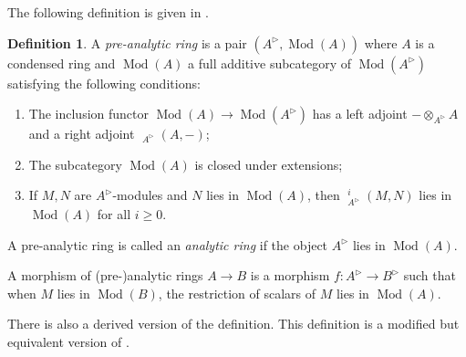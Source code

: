 \documentclass{article}
\theoremstyle{plain}
\theoremstyle{definition}
\newtheorem{defi}[thm]{Definition}
\theoremstyle{remark}
\DeclareMathOperator{\Homs}{\underline{Hom}}
\DeclareMathOperator{\modcat}{Mod}
\DeclareMathOperator{\exts}{\underline{Ext}}
\newcommand{\huflag}{\triangleright}
\begin{document}
The following definition is given in
\cite[\href{https://www.youtube.com/watch?v=dIwBTJNN7a0\&list=PLx5f8IelFRgGmu6gmL-Kf\_Rl\_6Mm7juZO\&index=8\&t=1633s}{Video 8, 27:13}]{ihesvid}.
\begin{defi}
A \emph{pre-analytic ring} is a pair $ (A ^{\huflag}, \modcat (A)) $ where $ A $ is a condensed ring and
$ \modcat (A) $ a full additive subcategory of $ \modcat (A ^{\huflag}) $ satisfying the following conditions:

\begin{enumerate}
\item The inclusion functor $ \modcat (A)\to \modcat (A ^{\huflag}) $ has a left adjoint
$ -\otimes _{A ^{\huflag}} A $ and a right adjoint $ \Homs _{A ^{\huflag}} (A, -) $;
\item The subcategory $ \modcat (A) $ is closed under extensions;
\item If $ M,N $ are $ A ^{\huflag} $-modules and $ N $ lies in $ \modcat (A) $,
then $ \exts ^{i} _{A ^{\huflag}} (M, N) $ lies in $ \modcat (A) $ for all $ i\geq 0 $.
\end{enumerate}
A pre-analytic ring is called an \emph{analytic ring} if the object $ A ^{\huflag} $ lies in $ \modcat (A) $.

A morphism of (pre-)analytic rings $ A\to B $ is a morphism $ f: A ^{\huflag}\to B ^{\huflag} $ such that
when $ M $ lies in $ \modcat (B) $, the restriction of scalars of $ M $ lies in $ \modcat (A) $.
\end{defi}

There is also a derived version of the definition.
This definition is a modified but equivalent version of \cite[\href
{https://www.youtube.com/watch?v=YxSZ1mTIpaA\&list=PLx5f8IelFRgGmu6gmL-Kf\_Rl\_6Mm7juZO\&t=3962s}{Video 1, 1:06:02}]{ihesvid}.
\end{document}

